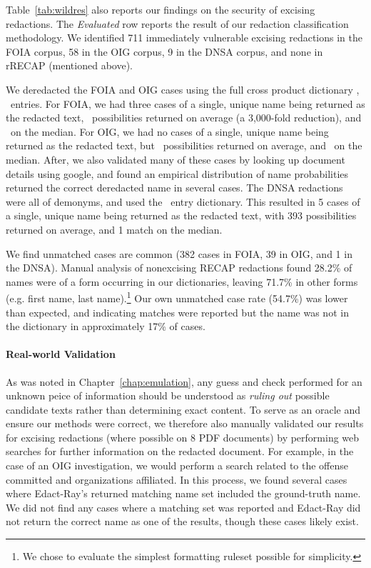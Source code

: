 Table~\ref{tab:wildres} also reports our findings on the security of excising redactions.
The \emph{Evaluated} row reports the result of our redaction classification methodology.
We identified 711 immediately vulnerable excising redactions in the FOIA corpus, 58 in the OIG corpus, 9 in the DNSA corpus, and none in rRECAP (mentioned above).

We deredacted the FOIA and OIG cases using the full cross product dictionary \emph{\fnxlnname}, \neltfnln\ entries.
For FOIA, we had three cases of a single, unique name being returned as the redacted text, \numFOIAavg\ possibilities returned on average (a 3,000-fold reduction), and \numFOIAmed\ on the median.
For OIG, we had no cases of a single, unique name being returned as the redacted text, but \numOIGavg\ possibilities returned on average, and \numOIGmed\ on the median.
After, we also validated many of these cases by looking up document details using google, and found an empirical distribution of name probabilities returned the correct deredacted name in several cases.
The DNSA redactions were all of demonyms, and used the \neltnatl\ entry dictionary.
This resulted in 5 cases of a single, unique name being returned as the redacted text, with 393 possibilities returned on average, and 1 match on the median.

We find unmatched cases are common (382 cases in FOIA, 39 in OIG, and 1 in the DNSA).
Manual analysis of nonexcising RECAP redactions found 28.2\% of names were of a form occurring in our dictionaries, leaving 71.7\% in other forms (e.g. first name, last name).\footnote{We chose to evaluate the simplest formatting ruleset possible for simplicity.}
Our own unmatched case rate (54.7\%) was lower than expected, and indicating matches were reported but the name was not in the dictionary in approximately 17\% of cases.

\paragraph{Real-world Validation}
As was noted in Chapter~\ref{chap:emulation}, any guess and check performed for an unknown peice of information should be understood as \emph{ruling out} possible candidate texts rather than determining exact content.
To serve as an oracle and ensure our methods were correct, we therefore also manually validated our results for excising redactions (where possible on 8 PDF documents) by performing web searches for further information on the redacted document.
For example, in the case of an OIG investigation, we would perform a search related to the offense committed and organizations affiliated.
In this process, we found several cases where Edact-Ray's returned matching name set included the ground-truth name.
We did not find any cases where a matching set was reported and Edact-Ray did not return the correct name as one of the results, though these cases likely exist.

